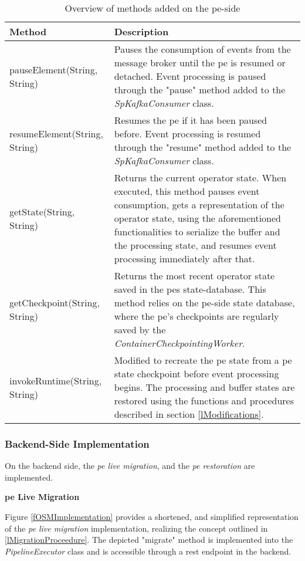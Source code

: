 \begin{table}[H]
    \caption{Overview of methods added on the \gls{pe}-side}
    \label{tNewMethods}
    \begin{tabular}{|p{5cm}|p{10cm}|}
    \hline
     \textbf{Method}&\textbf{Description}\\ 
     \hline\hline
     pauseElement(String, String)&Pauses the consumption of events from the message broker until the \gls{pe} is resumed or detached. Event processing is paused through the "pause" method added to the \textit{SpKafkaConsumer} class.\\
     \hline
     resumeElement(String, String)&Resumes the \gls{pe} if it has been paused before. Event processing is resumed through the "resume" method added to the \textit{SpKafkaConsumer} class.\\
     \hline
     getState(String, String)&Returns the current operator state. When executed, this method pauses event consumption, gets a representation of the operator state, using the aforementioned functionalities to serialize the buffer and the processing state, and resumes event processing immediately after that.\\
     \hline
     getCheckpoint(String, String)&Returns the most recent operator state saved in the \gls{pe}s state-database. This method relies on the \gls{pe}-side state database, where the \gls{pe}'s checkpoints are regularly saved by the \textit{ContainerCheckpointingWorker}.\\
     \hline
     invokeRuntime(String, String)&Modified to recreate the \gls{pe} state from a \gls{pe} state checkpoint before event processing begins. The processing and buffer states are restored using the functions and procedures described in section \ref{lModifications}.\\
     \hline
    \end{tabular}
\end{table}

\subsubsection{Backend-Side Implementation}
\label{lBackendSideImplementation}
On the backend side, the \textit{\acrshort{pe} live migration}, and the \textit{\acrshort{pe} restoration} are implemented.\par

\textbf{\acrlong{pe} Live Migration}\par
Figure \ref{fOSMImplementation} provides a shortened, and simplified representation of the \textit{\acrshort{pe} live migration} implementation, realizing the concept outlined in \ref{lMigrationProceedure}. The depicted "migrate" method is implemented into the \textit{PipelineExecutor} class and is accessible through a \gls{rest} endpoint in the backend.\par





